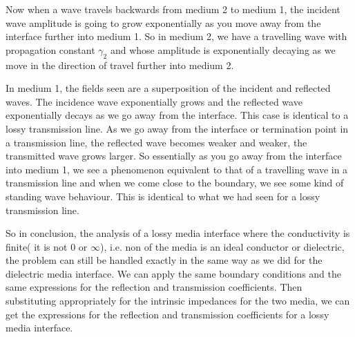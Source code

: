 Now when a wave travels backwards from medium 2 to medium 1, the incident wave amplitude is going to grow exponentially as you move away from the interface further into medium 1. So in medium 2, we have a travelling wave with propagation constant $\gamma_2$ and whose amplitude is exponentially decaying as we move in the direction of travel further into medium 2.

In medium 1, the fields seen are a superposition of the incident and reflected waves. The incidence wave exponentially grows and the reflected wave exponentially decays as we go away from the interface. This case is identical to a lossy transmission line. As we go away from the interface or termination point in a transmission line, the reflected wave becomes weaker and weaker, the transmitted wave grows larger. So essentially as you go away from the interface into medium 1, we see a phenomenon equivalent to that of a travelling wave in a transmission line and when we come close to the boundary, we see some kind of standing wave behaviour. This is identical to what we had seen for a lossy transmission line.

So in conclusion, the analysis of a lossy media interface where the conductivity is finite( it is not 0 or $\infty$), i.e. non of the media is an ideal conductor or dielectric, the problem can still be handled exactly in the same way as we did for the dielectric media interface. We can apply the same boundary conditions and the same expressions for the reflection and transmission coefficients. Then substituting appropriately for the intrinsic impedances for the two media, we can get the expressions for the reflection and transmission coefficients for a lossy media interface. 

